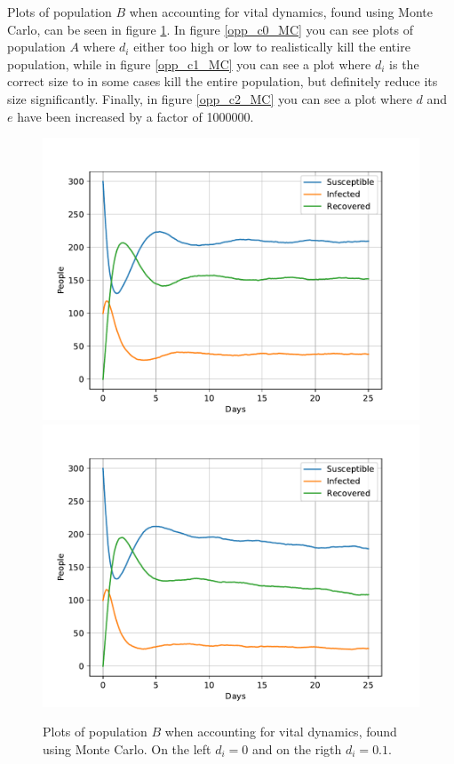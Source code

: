 \documentclass[a4paper]{article}
\begin{document}
	
	
	
		Plots of population $B$ when accounting for vital dynamics, found using Monte Carlo, can be seen in figure \ref{opp_c0B_MC}. In figure \ref{opp_c0_MC} you can see plots of population $A$ where $d_i$ either too high or low to realistically kill the entire population, while in figure \ref{opp_c1_MC} you can see a plot where $d_i$ is the correct size to in some cases kill the entire population, but definitely reduce its size significantly. Finally, in figure \ref{opp_c2_MC} you can see a plot where $d$ and $e$ have been increased by a factor of 1000000. 
	
	\begin{figure}[!htb]
		\centering 
		\includegraphics[scale=0.56]{../plots/opp_c_B0_MC.pdf}
		\includegraphics[scale=0.56]{../plots/opp_c_B1_MC.pdf}
		\caption{Plots of population $B$ when accounting for vital dynamics, found using Monte Carlo. On the left $d_i=0$ and on the rigth $d_i=0.1$.}
		\label{opp_c0B_MC}
	\end{figure}
	
\end{document}

